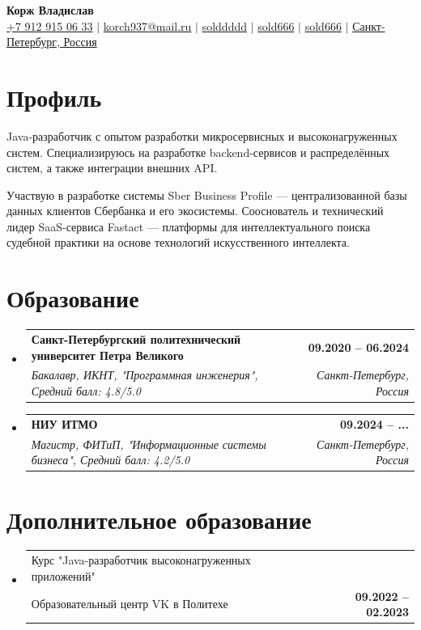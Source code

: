 \documentclass[a4paper,9pt]{report}
\makeatletter
\newcommand{\resumeSubheading}[4]{
    \vspace{-2pt}\item
    \begin{tabular*}{1.0\textwidth}[t]{l@{\extracolsep{\fill}}r}
        \textbf{\normalsize#1} & \textbf{\small #2} \\
        \textit{\normalsize#3} & \textit{\small #4} \\

    \end{tabular*}\vspace{-7pt}
}
\newcommand{\resumeSubheadingAdditional}[2]{
    \vspace{-2pt}\item
    \begin{tabular*}{1.0\textwidth}[t]{l@{\extracolsep{\fill}}r}
        \normalsize#1 & \textbf{\small #2} \\

    \end{tabular*}\vspace{-7pt}
}
\newcommand{\resumeSubHeadingListStart}{\begin{itemize}[leftmargin=0.0in, label={}]}
\newcommand{\resumeSubHeadingListEnd}{\end{itemize}}
\makeatother
\begin{document}
\begin{center}
\textbf{\huge Корж Владислав} \\ \vspace{5pt}
\small
\textcolor{NavyBlue}{\faMobile} \hspace{.5pt} \href{tel:+79129150633}{+7 912 915 06 33}
$|$
\textcolor{NavyBlue}{\faAt} \hspace{.5pt} \href{mailto:korch937@mail.ru}{korch937@mail.ru}
$|$
\textcolor{NavyBlue}{\faTelegram} \hspace{.5pt} \href{https://t.me/solddddd}{solddddd}
$|$
\textcolor{NavyBlue}{\faLinkedin} \hspace{.5pt} \href{https://www.linkedin.com/in/sold666/}{sold666}
$|$
\textcolor{NavyBlue}{\faGithub} \hspace{.5pt} \href{https://github.com/sold666}{sold666}
$|$
\textcolor{NavyBlue}{\faMapMarker} \hspace{.5pt} \href{https://maps.app.goo.gl/VvvW63dZxLZH6iVR6}{Санкт-Петербург, Россия}
\end{center}

\section{Профиль}

Java-разработчик с опытом разработки микросервисных и высоконагруженных систем.
Специализируюсь на разработке backend-сервисов и распределённых систем,
а также интеграции внешних API\@.

Участвую в разработке системы Sber Business Profile — централизованной базы данных клиентов Сбербанка и его экосистемы.
Сооснователь и технический лидер SaaS-сервиса Fastact — платформы для интеллектуального
поиска судебной практики на основе технологий искусственного интеллекта.

\section{Образование}
\resumeSubHeadingListStart
\resumeSubheading
{Санкт-Петербургский политехнический университет Петра Великого}{09.2020 -- 06.2024}
{Бакалавр, ИКНТ, "Программная инженерия", Средний балл: 4.8/5.0}{Санкт-Петербург, Россия}

\resumeSubheading
{НИУ ИТМО}{09.2024 -- ...}
{Магистр, ФИТиП, "Информационные системы бизнеса", Средний балл: 4.2/5.0}{Санкт-Петербург, Россия}
\resumeSubHeadingListEnd

\section{Дополнительное образование}
\resumeSubHeadingListStart
\resumeSubheadingAdditional
{Курс "Java-разработчик высоконагруженных приложений" \\ Образовательный центр VK в Политехе}{09.2022 -- 02.2023}
\resumeSubHeadingListEnd
\end{document}
